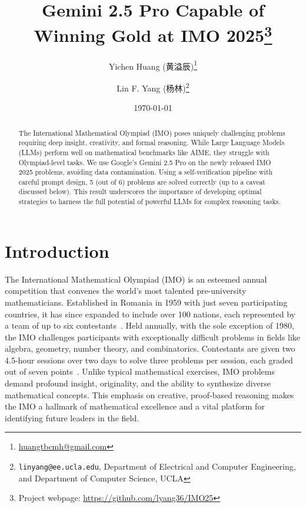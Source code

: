 \documentclass[12pt]{article}
\title{Gemini 2.5 Pro Capable of Winning Gold at IMO 2025\footnote{Project webpage: \url{https://github.com/lyang36/IMO25}}}
\author{Yichen Huang (黄溢辰)\thanks{\href{mailto:huangtbcmh@gmail.com}{huangtbcmh@gmail.com}} \and Lin F. Yang (杨林)\thanks{\texttt{linyang@ee.ucla.edu}, Department of Electrical and Computer Engineering, and Department of Computer Science, UCLA}}
\date{\today}
\begin{document}
\begin{CJK}{UTF8}{gbsn}
\maketitle
\end{CJK}
\begin{abstract}
The International Mathematical Olympiad (IMO) poses uniquely challenging problems requiring deep insight, creativity, and formal reasoning. While Large Language Models (LLMs) perform well on mathematical benchmarks like AIME, they struggle with Olympiad-level tasks. We use Google’s Gemini 2.5 Pro on the newly released IMO 2025 problems, avoiding data contamination. Using a self-verification pipeline with careful prompt design, 5 (out of 6) problems are solved correctly (up to a caveat discussed below). This result underscores the importance of developing optimal strategies to harness the full potential of powerful LLMs for complex reasoning tasks.
\end{abstract}

\section{Introduction}
The International Mathematical Olympiad (IMO) is an esteemed annual competition that convenes the world's most talented pre-university mathematicians. Established in Romania in 1959 with just seven participating countries, it has since expanded to include over 100 nations, each represented by a team of up to six contestants~\cite{imo_official}. Held annually, with the sole exception of 1980, the IMO challenges participants with exceptionally difficult problems in fields like algebra, geometry, number theory, and combinatorics. Contestants are given two 4.5-hour sessions over two days to solve three problems per session, each graded out of seven points~\cite{djukic2011imo}.
Unlike typical mathematical exercises, IMO problems demand profound insight, originality, and the ability to synthesize diverse mathematical concepts. This emphasis on creative, proof-based reasoning makes the IMO a hallmark of mathematical excellence and a vital platform for identifying future leaders in the field. 
\end{document}
